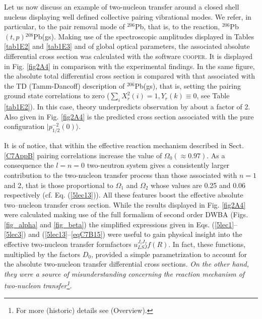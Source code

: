 Let us now discuss an example of two-nucleon transfer around a closed shell nucleus displaying well defined collective pairing vibrational modes. We refer, in particular, to the pair removal mode of $^{206}$Pb, that is, to the reaction, $^{206}$Pb$(t,p)$$^{208}$Pb(gs). Making use of the spectroscopic amplitudes displayed in Tables \ref{tab1E2} and \ref{tab1E3} and of global optical parameters, the associated  absolute differential cross section was calculated  with the software \textsc{cooper}. It is displayed in Fig. \ref{fig2A4} in comparison with the experimental findings. In  the same figure, the absolute total differential cross section is compared with that associated with the TD (Tamm-Dancoff) description of $^{206}$Pb(gs), that is, setting the pairing ground state correlations to zero ($\sum_i X^2_r(i)=1, Y_r(k)\equiv 0$, see Table \ref{tab1E2}). In this case, theory underpredicts observation by about a factor of 2.  Also given in Fig. \ref{fig2A4} is the predicted cross section associated with the pure configuration $|p_{1/2}^{-2}(0)\rangle$. 


It is of notice, that within the effective reaction mechanism described in Sect. \ref{C7AppB} pairing correlations increase the value of $\Omega_0(\approx 0.97)$. As a consequence the   $l=n=0$ two-neutron system gives a consistently larger contribution to the two-nucleon transfer process than those associated with $n=1$ and 2, that is those proportional to $\Omega_1$ and $\Omega_2$ whose values are 0.25 and 0.06 respectively (cf. Eq. (\ref{5lec13})). All these features boost the effective absolute two--nucleon  transfer cross section. While the results displayed in Fig. \ref{fig2A4} were calculated making use of the full formalism of second order DWBA (Figs. \ref{fig_alpha} and \ref{fig_beta}) the simplified expressions given in Eqs. (\ref{5lec1}--\ref{5lec3}) and (\ref{5lec13}--\ref{eqC7B15}) were useful to gain physical insight into the effective  two-nucleon transfer formfactors $u^{J_iJ_f}_{LSJ}f(R)$. In fact, these functions, multiplied by the factors $D_0$, provided a simple parametrization to account for the absolute two-nucleon transfer  differential cross sections. \emph{On the other hand, they were a source of misunderstanding concerning the reaction mechanism of two-nucleon transfer\footnote{For more (historic) details see \cite{Bohr:19} (Overview).}}.



